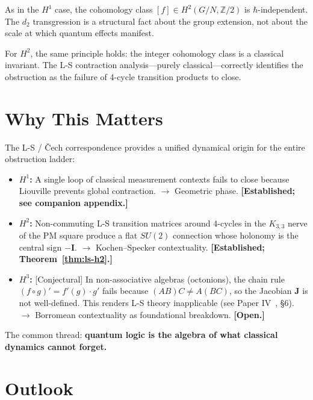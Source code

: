 \documentclass[11pt]{article}
\begin{document}
As in the $H^1$ case, the cohomology class $[f] \in H^2(G/N, \mathbb{Z}/2)$
is $\hbar$-independent. The $d_2$ transgression is a structural fact about the
group extension, not about the scale at which quantum effects manifest.

For $H^2$, the same principle holds: the integer cohomology class is a classical
invariant. The L-S contraction analysis---purely classical---correctly
identifies the obstruction as the failure of 4-cycle transition products to close.

\section{Why This Matters}
\label{sec:why}

The L-S / \v{C}ech correspondence provides a unified dynamical origin for the
entire obstruction ladder:

\begin{itemize}
  \item \textbf{$H^1$:} A single loop of classical measurement contexts fails to
    close because Liouville prevents global contraction. $\to$ Geometric phase.
    \textbf{[Established; see companion appendix.]}
  \item \textbf{$H^2$:} Non-commuting L-S transition matrices around 4-cycles
    in the $K_{3,3}$ nerve of the PM square produce a flat $SU(2)$ connection
    whose holonomy is the central sign $-\mathbf{I}$.
    $\to$ Kochen--Specker contextuality.
    \textbf{[Established; Theorem~\ref{thm:ls-h2}.]}
  \item \textbf{$H^3$:} [Conjectural] In non-associative algebras (octonions), the
    chain rule $(f\circ g)' = f'(g)\cdot g'$ fails because $(AB)C \neq A(BC)$,
    so the Jacobian $\mathbf{J}$ is not well-defined. This renders L-S theory
    inapplicable (see Paper IV~\cite{PaperIV}, \S6). $\to$ Borromean contextuality
    as foundational breakdown. \textbf{[Open.]}
\end{itemize}

The common thread: \textbf{quantum logic is the algebra of what classical
dynamics cannot forget.}

\section{Outlook}
\label{sec:outlook}
\end{document}
